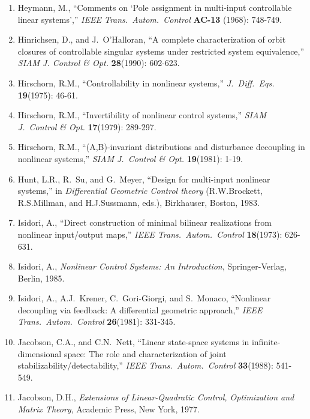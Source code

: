 \begin{enumerate}
\item
Heymann, M., ``Comments on `Pole assignment in multi-input cont\-rollable
linear systems','' {\it IEEE Trans.\ Autom.\ Control} {\bf AC-13} (1968):
748-749.

\item
Hinrichsen, D., and J.\ O'Halloran, ``A complete characterization of orbit
closures of controllable singular systems under restricted system
equivalence,'' {\it SIAM J. Control \& Opt.} {\bf 28}(1990): 602-623.

\item
Hirschorn, R.M., ``Controllability in nonlinear systems,'' {\it J.\ Diff.\
Eqs.} {\bf 19}(1975): 46-61.

\item
Hirschorn, R.M., ``Invertibility of nonlinear control systems,'' {\it SIAM J.\
Control \& Opt.} {\bf 17}(1979): 289-297.

\item
Hirschorn, R.M., ``(A,B)-invariant distributions and disturbance decoupling in
nonlinear systems,'' {\it SIAM J.\ Control \& Opt.} {\bf 19}(1981): 1-19.

\item
Hunt, L.R., R.\ Su, and G.\ Meyer, ``Design for multi-input nonlinear
systems,'' in {\it Differential Geometric Control theory} (R.W.Brockett,
R.S.Millman, and H.J.Sussmann, eds.), Birkhauser, Boston, 1983.

\item
Isidori, A., ``Direct construction of minimal bilinear realizations from
nonlinear input/output maps,'' {\it IEEE Trans.\ Autom.\ Control} {\bf
18}(1973): 626-631.

\item
Isidori, A., {\it Nonlinear Control Systems: An Introduction},
Springer-Verlag, Berlin, 1985.

\item
Isidori, A., A.J.\ Krener, C.\ Gori-Giorgi, and S.\ Monaco, ``Nonlinear
decoupling via feedback: A differential geometric approach,'' {\it IEEE
Trans.\ Autom.\ Control} {\bf 26}(1981): 331-345.

\item
Jacobson, C.A., and C.N.\ Nett, ``Linear state-space systems in
in\-fin\-ite-dim\-en\-sion\-al space: The role and characterization of joint
stabilizability/detectability,'' {\it IEEE Trans.\ Autom.\ Control} {\bf
33}(1988): 541-549.

\item
Jacobson, D.H., {\it Extensions of Linear-Quadratic Control, Optimization and
Matrix Theory}, Academic Press, New York, 1977.


\end{enumerate}
